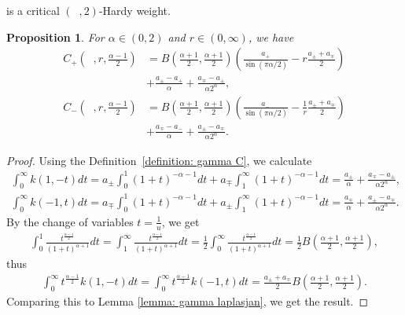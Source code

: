 \documentclass[12pt, a4paper]{amsart}
\newtheorem{proposition}[theorem]{Proposition}
\DeclareMathOperator{\Masss}{\nu_{\alpha}^{(\boldsymbol{a})}}
\begin{document}
is a critical $\left(\Masss, 2\right)$-Hardy weight.
\begin{proposition}
\label{proposition: constants nu^a}
For $\alpha \in (0, 2)$ and $r \in (0, \infty)$, we have
\begin{align*}
    C_{+}\left(\Masss, r, \frac{\alpha - 1}{2}\right) &= B\left(\frac{\alpha+1}{2},\frac{\alpha+1}{2}\right) \left(\frac{a_+}{\sin(\pi\alpha/2)} - r\frac{a_\pm + a_\mp}{2} \right) 
    \\
    &+ \frac{a_\pm - a_+}{\alpha} + \frac{a_\mp -a_\pm}{\alpha 2^\alpha},
    \\
    C_{-}\left(\Masss, r, \frac{\alpha - 1}{2}\right) &= B\left(\frac{\alpha+1}{2},\frac{\alpha+1}{2}\right) \left(\frac{a_-}{\sin(\pi\alpha/2)} -\frac{1}{r} \frac{a_\pm + a_\mp}{2}\right) 
    \\
    &+ \frac{a_\mp - a_-}{\alpha} + \frac{a_\pm - a_\mp}{\alpha 2^\alpha}.
\end{align*}
\end{proposition}

\begin{proof} Using the Definition~\ref{definition: gamma C}, we calculate
\begin{align*}
    \int_0^\infty k(1, -t)dt = a_\pm \int_0^1 (1 + t)^{-\alpha - 1}dt + a_\mp \int_1^\infty (1 + t)^{-\alpha - 1}dt = \frac{a_\pm}{\alpha} + \frac{a_\mp - a_\pm}{\alpha 2^\alpha},
    \\
    \int_0^\infty k(-1, t)dt = a_\mp \int_0^1 (1 + t)^{-\alpha - 1}dt + a_\pm \int_1^\infty (1 + t)^{-\alpha - 1}dt = \frac{a_\mp}{\alpha} + \frac{a_\pm - a_\mp}{\alpha 2^\alpha}.
\end{align*}
By the change of variables $t = \frac{1}{u}$, we get
\begin{align*}
    \int_{0}^1 \frac{t^{\frac{\alpha - 1}{2}}}{(1 + t)^{\alpha+1}}dt = \int_{1}^\infty \frac{t^{\frac{\alpha - 1}{2}}}{(1 + t)^{\alpha+1}}dt = \frac{1}{2}\int_{0}^\infty \frac{t^{\frac{\alpha - 1}{2}}}{(1 + t)^{\alpha+1}}dt = \frac{1}{2}B\left(\frac{\alpha+1}{2},\frac{\alpha+1}{2}\right),
\end{align*}
thus
\begin{align*}
\int_{0}^\infty t^{\frac{\alpha - 1}{2}}k(1, -t)dt = \int_{0}^\infty t^{\frac{\alpha - 1}{2}}k(-1, t)dt = \frac{a_\pm + a_\mp}{2}B\left(\frac{\alpha+1}{2},\frac{\alpha+1}{2}\right).
\end{align*}
Comparing this to Lemma \ref{lemma: gamma laplasjan}, we get the result.
\end{proof}
\end{document}
